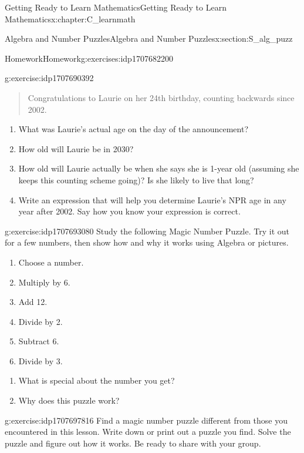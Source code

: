 \documentclass[oneside,10pt,]{book}
\numberwithin{equation}{chapter}
\begin{document}
\begin{chapterptx}{Getting Ready to Learn Mathematics}{}{Getting Ready to Learn Mathematics}{}{}{x:chapter:C_learnmath}
\begin{sectionptx}{Algebra and Number Puzzles}{}{Algebra and Number Puzzles}{}{}{x:section:S_alg_puzz}
\begin{exercises-subsection}{Homework}{}{Homework}{}{}{g:exercises:idp1707682200}
\begin{divisionexercise}{3}{}{}{g:exercise:idp1707690392}
\begin{quote}
Congratulations to Laurie on her 24th birthday, counting backwards since 2002.\end{quote}
%
\begin{enumerate}[font=\bfseries,label=(\alph*),ref=\alph*]
\item{}What was Laurie's actual age on the day of the announcement?%
\item{}How old will Laurie be in 2030?%
\item{}How old will Laurie actually be when she says she is 1-year old (assuming she keeps this counting scheme going)? Is she likely to live that long?%
\item{}Write an expression that will help you determine Laurie's NPR age in any year after 2002. Say how you know your expression is correct.%
\end{enumerate}
\end{divisionexercise}%
\begin{divisionexercise}{4}{}{}{g:exercise:idp1707693080}%
Study the following Magic Number Puzzle. Try it out for a few numbers, then show how and why it works using Algebra or pictures.%
\begin{enumerate}[label=(\alph*)]
\item{}Choose a number.%
\item{}Multiply by 6.%
\item{}Add 12.%
\item{}Divide by 2.%
\item{}Subtract 6.%
\item{}Divide by 3.%
\end{enumerate}
%
\begin{enumerate}[font=\bfseries,label=(\alph*),ref=\alph*]
\item{}What is special about the number you get?%
\item{}Why does this puzzle work?%
\end{enumerate}
\end{divisionexercise}%
\begin{divisionexercise}{5}{}{}{g:exercise:idp1707697816}%
Find a magic number puzzle different from those you encountered in this lesson. Write down or print out a puzzle you find. Solve the puzzle and figure out how it works. Be ready to share with your group.%
\end{divisionexercise}%
\end{exercises-subsection}
\end{sectionptx}
\end{chapterptx}
%
%
\typeout{************************************************}
\end{document}
